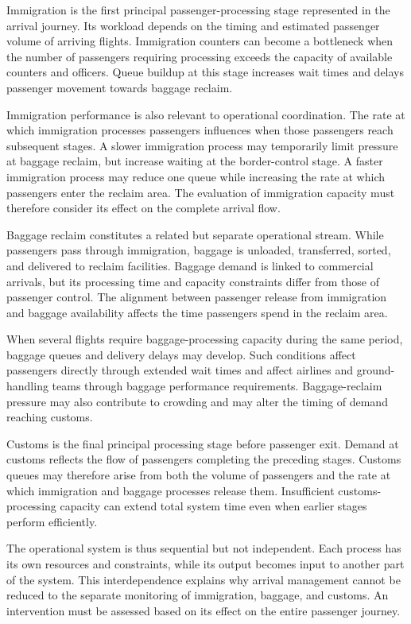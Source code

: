 Immigration is the first principal passenger-processing stage represented in the arrival journey. Its workload depends on the timing and estimated passenger volume of arriving flights. Immigration counters can become a bottleneck when the number of passengers requiring processing exceeds the capacity of available counters and officers. Queue buildup at this stage increases wait times and delays passenger movement towards baggage reclaim.

Immigration performance is also relevant to operational coordination. The rate at which immigration processes passengers influences when those passengers reach subsequent stages. A slower immigration process may temporarily limit pressure at baggage reclaim, but increase waiting at the border-control stage. A faster immigration process may reduce one queue while increasing the rate at which passengers enter the reclaim area. The evaluation of immigration capacity must therefore consider its effect on the complete arrival flow.

Baggage reclaim constitutes a related but separate operational stream. While passengers pass through immigration, baggage is unloaded, transferred, sorted, and delivered to reclaim facilities. Baggage demand is linked to commercial arrivals, but its processing time and capacity constraints differ from those of passenger control. The alignment between passenger release from immigration and baggage availability affects the time passengers spend in the reclaim area.

When several flights require baggage-processing capacity during the same period, baggage queues and delivery delays may develop. Such conditions affect passengers directly through extended wait times and affect airlines and ground-handling teams through baggage performance requirements. Baggage-reclaim pressure may also contribute to crowding and may alter the timing of demand reaching customs.

Customs is the final principal processing stage before passenger exit. Demand at customs reflects the flow of passengers completing the preceding stages. Customs queues may therefore arise from both the volume of passengers and the rate at which immigration and baggage processes release them. Insufficient customs-processing capacity can extend total system time even when earlier stages perform efficiently.

The operational system is thus sequential but not independent. Each process has its own resources and constraints, while its output becomes input to another part of the system. This interdependence explains why arrival management cannot be reduced to the separate monitoring of immigration, baggage, and customs. An intervention must be assessed based on its effect on the entire passenger journey.

